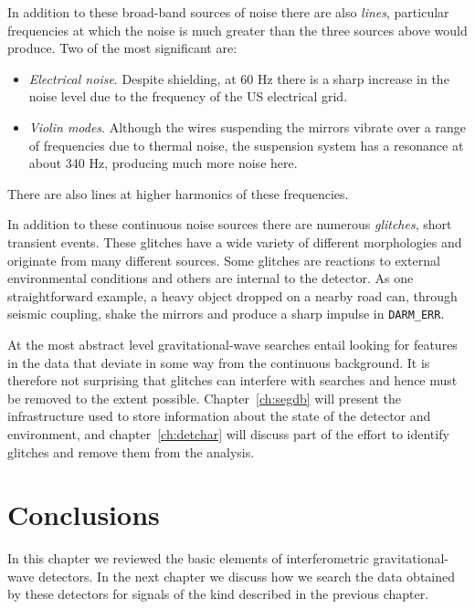 %
In addition to these broad-band sources of noise there are also
\emph{lines}, particular frequencies at which the noise is much
greater than the three sources above would produce.  Two of the most
significant are:
%
\begin{itemize}
\item \emph{Electrical noise}.  Despite shielding, at 60 Hz there is a
sharp increase in the noise level due to the frequency of the US
electrical grid.
\item \emph{Violin modes}.  Although the wires suspending the mirrors
vibrate over a range of frequencies due to thermal noise, the
suspension system has a resonance at about 340 Hz, producing much
more noise here.
\end{itemize}
%
There are also lines at higher harmonics of these frequencies.

In addition to these continuous noise sources there are numerous
\emph{glitches}, short transient events.  These glitches have a wide
variety of different morphologies and originate from many different
sources.  Some glitches are reactions to external environmental
conditions and others are internal to the detector.  As one
straightforward example, a heavy object dropped on a nearby road 
can, through seismic coupling, shake the mirrors and produce a sharp
impulse in \texttt{DARM\_ERR}.

At the most abstract level gravitational-wave searches entail looking
for features in the data that deviate in some way from the continuous
background.  It is therefore not surprising that glitches can
interfere with searches and hence must be removed to the extent
possible.  Chapter~\ref{ch:segdb} will present the infrastructure used
to store information about the state of the detector and environment,
and chapter~\ref{ch:detchar} will discuss part of the effort to
identify glitches and remove them from the analysis.

\section{Conclusions}

In this chapter we reviewed the basic elements of interferometric
gravitational-wave detectors.  In the next chapter we discuss how we
search the data obtained by these detectors for signals of the kind
described in the previous chapter.


